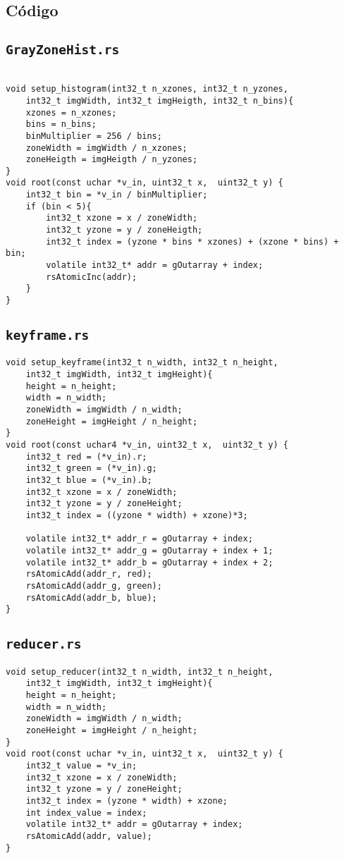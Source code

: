 \begin{Anexos}
\section*{Código}
\lstset{style=CInputStyle}
\subsection*{\texttt{GrayZoneHist.rs}}
\begin{lstlisting}

void setup_histogram(int32_t n_xzones, int32_t n_yzones,
    int32_t imgWidth, int32_t imgHeigth, int32_t n_bins){
    xzones = n_xzones;
    bins = n_bins;
    binMultiplier = 256 / bins;
    zoneWidth = imgWidth / n_xzones;
    zoneHeigth = imgHeigth / n_yzones;
}
void root(const uchar *v_in, uint32_t x,  uint32_t y) {
    int32_t bin = *v_in / binMultiplier;
    if (bin < 5){
        int32_t xzone = x / zoneWidth;
        int32_t yzone = y / zoneHeigth;
        int32_t index = (yzone * bins * xzones) + (xzone * bins) + bin;
        volatile int32_t* addr = gOutarray + index;
        rsAtomicInc(addr);
    }
}
\end{lstlisting}

\subsection*{\texttt{keyframe.rs}}
\begin{lstlisting}
void setup_keyframe(int32_t n_width, int32_t n_height,
    int32_t imgWidth, int32_t imgHeight){
    height = n_height;
    width = n_width;
    zoneWidth = imgWidth / n_width;
    zoneHeight = imgHeight / n_height;
}
void root(const uchar4 *v_in, uint32_t x,  uint32_t y) {
    int32_t red = (*v_in).r;
    int32_t green = (*v_in).g;
    int32_t blue = (*v_in).b;
    int32_t xzone = x / zoneWidth;
    int32_t yzone = y / zoneHeight;
    int32_t index = ((yzone * width) + xzone)*3;

    volatile int32_t* addr_r = gOutarray + index;
    volatile int32_t* addr_g = gOutarray + index + 1;
    volatile int32_t* addr_b = gOutarray + index + 2;
    rsAtomicAdd(addr_r, red);
    rsAtomicAdd(addr_g, green);
    rsAtomicAdd(addr_b, blue);
}
\end{lstlisting}


\subsection*{\texttt{reducer.rs}}
\begin{lstlisting}
void setup_reducer(int32_t n_width, int32_t n_height,
    int32_t imgWidth, int32_t imgHeight){
    height = n_height;
    width = n_width;
    zoneWidth = imgWidth / n_width;
    zoneHeight = imgHeight / n_height;
}
void root(const uchar *v_in, uint32_t x,  uint32_t y) {
    int32_t value = *v_in;
    int32_t xzone = x / zoneWidth;
    int32_t yzone = y / zoneHeight;
    int32_t index = (yzone * width) + xzone;
    int index_value = index;
    volatile int32_t* addr = gOutarray + index;
    rsAtomicAdd(addr, value);
}
\end{lstlisting}


\end{Anexos}
